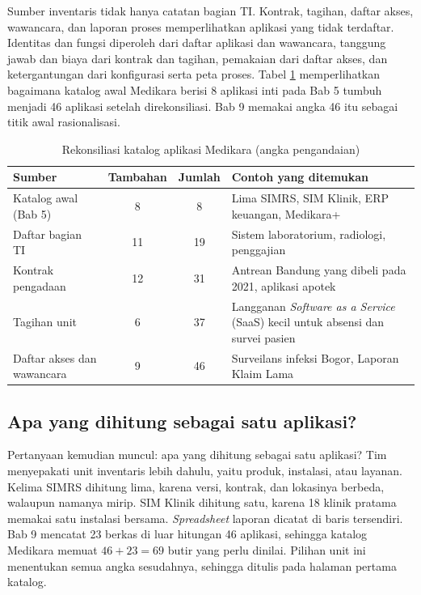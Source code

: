Sumber inventaris tidak hanya catatan bagian TI. Kontrak, tagihan, daftar akses, wawancara, dan
laporan proses memperlihatkan aplikasi yang tidak terdaftar. Identitas dan fungsi diperoleh dari
daftar aplikasi dan wawancara, tanggung jawab dan biaya dari kontrak dan tagihan, pemakaian dari
daftar akses, dan ketergantungan dari konfigurasi serta peta proses. Tabel
\ref{tab:ch07-rekonsiliasi} memperlihatkan bagaimana katalog awal Medikara berisi 8 aplikasi inti pada Bab 5 tumbuh menjadi
46 aplikasi setelah direkonsiliasi. Bab 9 memakai angka 46 itu sebagai titik awal rasionalisasi.

\begin{table}[!htb]
  \centering
  \caption{Rekonsiliasi katalog aplikasi Medikara (angka pengandaian)}
  \label{tab:ch07-rekonsiliasi}
  \small
  \begin{tabularx}{\textwidth}{>{\raggedright\arraybackslash}p{3.7cm}cc>{\raggedright\arraybackslash}X}
    \hline
    \textbf{Sumber} & \textbf{Tambahan} & \textbf{Jumlah} & \textbf{Contoh yang ditemukan} \\
    \hline
    Katalog awal (Bab 5) & 8 & 8 & Lima SIMRS, SIM Klinik, ERP keuangan, Medikara+ \\
    \hline
    Daftar bagian TI & 11 & 19 & Sistem laboratorium, radiologi, penggajian \\
    \hline
    Kontrak pengadaan & 12 & 31 & Antrean Bandung yang dibeli pada 2021, aplikasi apotek \\
    \hline
    Tagihan unit & 6 & 37 & Langganan \textit{Software as a Service} (SaaS) kecil untuk absensi dan survei pasien \\
    \hline
    Daftar akses dan wawancara & 9 & 46 & Surveilans infeksi Bogor, Laporan Klaim Lama \\
    \hline
  \end{tabularx}
\end{table}

\subsection*{Apa yang dihitung sebagai satu aplikasi?}

Pertanyaan kemudian muncul: apa yang dihitung sebagai satu aplikasi? Tim menyepakati unit
inventaris lebih dahulu, yaitu produk, instalasi, atau layanan. Kelima SIMRS dihitung lima,
karena versi, kontrak, dan lokasinya berbeda, walaupun namanya mirip. SIM Klinik dihitung satu,
karena 18 klinik pratama memakai satu instalasi bersama. \textit{Spreadsheet} laporan dicatat di baris
tersendiri. Bab 9 mencatat 23 berkas di luar hitungan 46 aplikasi, sehingga katalog
Medikara memuat $46 + 23 = 69$ butir yang perlu dinilai. Pilihan unit ini menentukan semua
angka sesudahnya, sehingga ditulis pada halaman pertama katalog.

